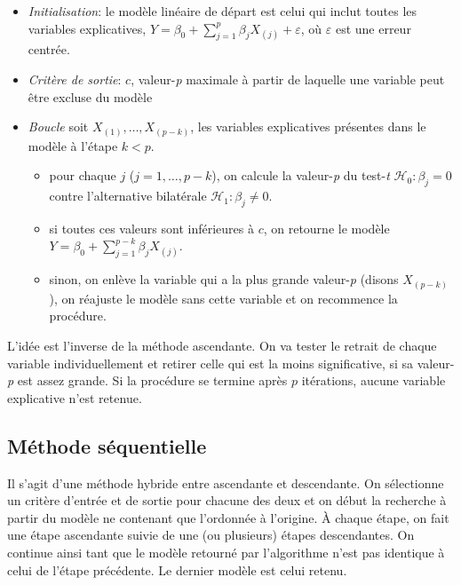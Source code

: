 \documentclass[
  11pt,
  letterpaper,
]{book}
\providecommand{\tightlist}{%
  \setlength{\itemsep}{0pt}\setlength{\parskip}{0pt}}
\theoremstyle{definition}
\theoremstyle{definition}
\theoremstyle{definition}
\theoremstyle{definition}
\theoremstyle{remark}
\begin{document}
\begin{itemize}
\tightlist
\item
  \emph{Initialisation}: le modèle linéaire de départ est celui qui inclut toutes les variables explicatives, \(Y=\beta_0+\sum_{j=1}^p \beta_j X_{(j)}+\varepsilon\), où \(\varepsilon\) est une erreur centrée.
\item
  \emph{Critère de sortie}: \(c\), valeur-\emph{p} maximale à partir de laquelle une variable peut être excluse du modèle
\item
  \emph{Boucle} soit \(X_{(1)}, \ldots, X_{(p-k)}\), les variables explicatives présentes dans le modèle à l'étape \(k<p\).

  \begin{itemize}
  \tightlist
  \item
    pour chaque \(j\) (\(j =1, \ldots, p-k\)), on calcule la valeur-\emph{p} du test-\emph{t} \(\mathcal{H}_0: \beta_{j}=0\) contre l'alternative bilatérale \(\mathcal{H}_1: \beta_{j} \neq 0\).
  \item
    si toutes ces valeurs sont inférieures à \(c\), on retourne le modèle \(Y=\beta_0 + \sum_{j=1}^{p-k} \beta_j X_{(j)}\).
  \item
    sinon, on enlève la variable qui a la plus grande valeur-\emph{p} (disons \(X_{(p-k)}\)), on réajuste le modèle sans cette variable et on recommence la procédure.
  \end{itemize}
\end{itemize}

L'idée est l'inverse de la méthode ascendante. On va tester le retrait de chaque variable individuellement et retirer celle qui est la moins significative, si sa valeur-\emph{p} est assez grande. Si la procédure se termine après \(p\) itérations, aucune variable explicative n'est retenue.

\hypertarget{muxe9thode-suxe9quentielle}{%
\subsection{Méthode séquentielle}\label{muxe9thode-suxe9quentielle}}

Il s'agit d'une méthode hybride entre ascendante et descendante. On sélectionne un critère d'entrée et de sortie pour chacune des deux et on début la recherche à partir du modèle ne contenant que l'ordonnée à l'origine. À chaque étape, on fait une étape ascendante suivie de une (ou plusieurs) étapes descendantes. On continue ainsi tant que le modèle retourné par l'algorithme n'est pas identique à celui de l'étape précédente. Le dernier modèle est celui retenu.
\end{document}
